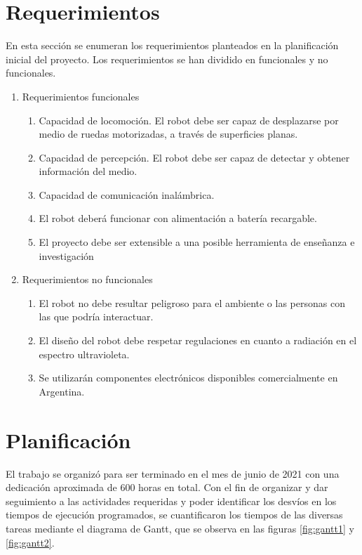 \section{Requerimientos}

En esta sección se enumeran los requerimientos planteados en la planificación inicial del proyecto.  Los  requerimientos se han dividido en funcionales y no funcionales.

\label{sec:requerimientos}

\begin{enumerate}
\item Requerimientos funcionales
	\begin{enumerate}
	\item Capacidad de locomoción.  El robot debe ser capaz de desplazarse por medio de ruedas motorizadas, a través de superficies planas.
	\item Capacidad de percepción. El robot debe ser capaz de detectar y obtener información del medio. 
	\item Capacidad de comunicación inalámbrica.
	\item El robot deberá funcionar con alimentación a batería recargable.
	\item El proyecto debe ser extensible a una posible herramienta de enseñanza e investigación

	\end{enumerate}
\item Requerimientos no funcionales
	\begin{enumerate}
	\item El robot no debe resultar peligroso para el ambiente o las personas con las que podría interactuar.
	\item El diseño del robot debe respetar regulaciones en cuanto a radiación en el espectro ultravioleta.
	\item Se utilizarán componentes electrónicos disponibles comercialmente en Argentina.
	\end{enumerate}
\end{enumerate}

\section{Planificación}

El trabajo se organizó para ser terminado en el mes de junio de 2021 con una dedicación aproximada de 600 horas en total. Con el fin de organizar y dar seguimiento a las actividades requeridas y poder identificar los desvíos en los tiempos de ejecución programados, se cuantificaron los tiempos de las diversas tareas mediante el diagrama de Gantt, que se observa en las figuras \ref{fig:gantt1} y \ref{fig:gantt2}.


